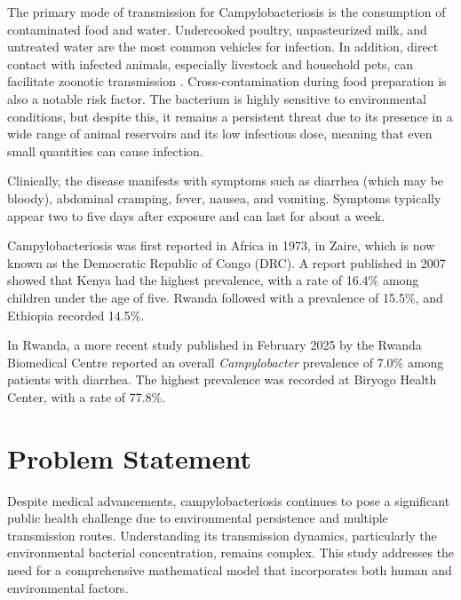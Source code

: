 \documentclass[a4paper,12pt]{report}
\begin{document}
The primary mode of transmission for Campylobacteriosis is the consumption of contaminated food and water. Undercooked poultry, unpasteurized milk, and untreated water are the most common vehicles for infection. In addition, direct contact with infected animals, especially livestock and household pets, can facilitate zoonotic transmission \cite{HUM}. Cross-contamination during food preparation is also a notable risk factor. The bacterium is highly sensitive to environmental conditions, but despite this, it remains a persistent threat due to its presence in a wide range of animal reservoirs and its low infectious dose, meaning that even small quantities can cause infection.

Clinically, the disease manifests with symptoms such as diarrhea (which may be bloody), abdominal cramping, fever, nausea, and vomiting. Symptoms typically appear two to five days after exposure and can last for about a week.

Campylobacteriosis was first reported in Africa in 1973, in Zaire, which is now known as the Democratic Republic of Congo (DRC)\cite{DRC}. A report published in 2007 showed that Kenya had the highest prevalence, with a rate of 16.4\% among children under the age of five. Rwanda followed with a prevalence of 15.5\%, and Ethiopia recorded 14.5\%.

In Rwanda, a more recent study published in February 2025 by the Rwanda Biomedical Centre reported an overall \textit{Campylobacter} prevalence of 7.0\% among patients with diarrhea. The highest prevalence was recorded at Biryogo Health Center, with a rate of 77.8\%.\cite{BMC}






\vspace{0.5cm}









\section{ Problem Statement}
Despite medical advancements, campylobacteriosis continues to pose a significant public health challenge due to environmental persistence and multiple transmission routes. Understanding its transmission dynamics, particularly the environmental bacterial concentration, remains complex. This study addresses the need for a comprehensive mathematical model that incorporates both human and environmental factors.
\end{document}
